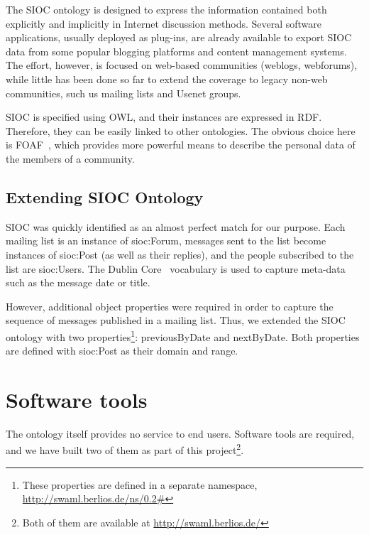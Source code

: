 \documentclass{llncs}
\begin{document}

The SIOC ontology is designed to express the information contained
both explicitly  and implicitly in Internet discussion methods. Several 
software applications, usually deployed as plug-ins, are already available 
to export SIOC data from some popular blogging platforms and content 
management systems. The effort, however, is focused on web-based communities 
(weblogs, webforums), while little has been done so far to extend the coverage 
to legacy non-web communities, such us mailing lists and Usenet groups.

SIOC is specified using OWL, and their instances are expressed
in RDF. Therefore, they can be easily linked to other ontologies.
The obvious choice here is FOAF~\cite{FOAF}, which provides more
powerful means to describe the personal data of the members of
a community.

\subsection{Extending SIOC Ontology}

SIOC was quickly identified as an almost perfect match for our
purpose. Each mailing list is an instance of \textsf{sioc:Forum},
messages sent to the list become instances of \textsf{sioc:Post}
(as well as their replies), and the people subscribed to the
list are \textsf{sioc:User}s. The Dublin Core~\cite{DublinCore}
vocabulary is used to capture meta-data such as the message
date or title.

However, additional object properties were required
in order to capture the sequence of messages published in a
mailing list. Thus, we extended the SIOC ontology with two
properties\footnote{These properties are defined in a separate
namespace, \url{http://swaml.berlios.de/ns/0.2\#}}:
\textsf{previousByDate} and \textsf{nextByDate}. Both properties
are defined with \textsf{sioc:Post} as their domain and range.

\section{\label{sec:tools}Software tools}

The ontology itself provides no service to end users. Software tools
are required, and we have built two of them as part of this
project\footnote{Both of them are available at \url{http://swaml.berlios.de/}}.
\end{document}
